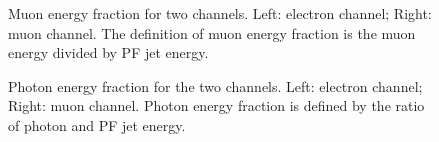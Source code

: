 \documentclass[12pt]{article} %
\begin{document}
\begin{figure}[H] %
  \caption{Muon energy fraction for two channels. Left: electron channel; Right: muon channel. The definition of muon energy fraction is the muon energy divided by PF jet energy.}
  \label{fig:MuEF}
\end{figure}

\begin{figure}[H] %
  \caption{Photon energy fraction for the two channels. Left: electron channel; Right: muon channel. Photon energy fraction is defined by the ratio of photon and PF jet energy.}
  \label{fig:PhoEF}
\end{figure}
\end{document}
